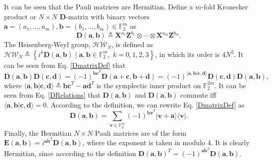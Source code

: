 \documentclass[lettersize,journal,onecolumn]{IEEEtran}
\begin{document}
   It can be seen that the Pauli matrices are Hermitian.
Define a $m$-fold Kronecker product or $N \times N$ $\mathbf{D}$-matrix with binary vectors $\mathbf{a} = (a_1, ..., a_m), \mathbf{b} = (b_1,..., b_m) \in \mathbb{F}_2^m$ as
\begin{equation}\label{DmatrixDef}
	\mathbf{D}\left(\mathbf{a}, \mathbf{b}\right) \triangleq \mathbf{X}^{a_1}\mathbf{Z}^{b_1} \otimes \cdots \otimes \mathbf{X}^{a_m}\mathbf{Z}^{b_m}.
\end{equation}
The Heisenberg-Weyl group, $\mathcal{HW}_N$, is defined as $\mathcal{HW}_N \triangleq \left\{i^k \mathbf{D}\left(\mathbf{a}, \mathbf{b}\right) \; | \; \mathbf{a, b} \in \mathbb{F}_2^m, \; k=0,1,2,3  \right\}$, in which its order is $4N^2$. It can be seen from Eq. \eqref{DmatrixDef} that
\begin{equation}\label{DRelations}
	\mathbf{D}\left(\mathbf{a, b}\right) \mathbf{D}\left(\mathbf{c, d}\right) = \left(-1\right)^{\mathbf{b c}^T}\mathbf{D}\left(\mathbf{a+c, b+d}\right) = \left(-1\right)^{ \langle\mathbf{a,b} | \mathbf{c, d}\rangle}\mathbf{D}\left(\mathbf{c, d}\right) \mathbf{D}\left(\mathbf{a, b}\right),
\end{equation}
where $\langle \mathbf{a,b} | \mathbf{c, d} \rangle \triangleq \mathbf{b c}^T-\mathbf{a d}^T$ is the symplectic inner product on $\mathbb{F}_2^{2m}$. It can be seen from Eq. \eqref{DRelations} that $\mathbf{D}\left(\mathbf{a, b}\right)$ and $\mathbf{D}\left(\mathbf{a, b}\right)$ commute iff $\langle \mathbf{a,b} | \mathbf{c, d}\rangle = 0$. According to the definition, we can rewrite Eq. \eqref{DmatrixDef} as 
\begin{equation}\label{DketDef}
	\mathbf{D}\left(\mathbf{a, b}\right) = \sum_{\mathbf{v} \in \mathbb{F}_2^m}{\left(-1\right)^{\mathbf{b v}^T} |\mathbf{v+a}\rangle \langle\mathbf{v}|}.
\end{equation}
Finally, the Hermitian $N \times N$ Pauli matrices are of the form $\mathbf{E}(\mathbf{a}, \mathbf{b}) = i^{\mathbf{a}\mathbf{b}^T}\mathbf{D}(\mathbf{a}, \mathbf{b})$, where the exponent is taken in modulo $4$. It is clearly Hermitian, since according to the definition $\mathbf{D}\left(\mathbf{a, b}\right)^T = \left(-1\right)^{\mathbf{a b}^T}\mathbf{D}\left(\mathbf{a, b}\right)$.
\end{document}
